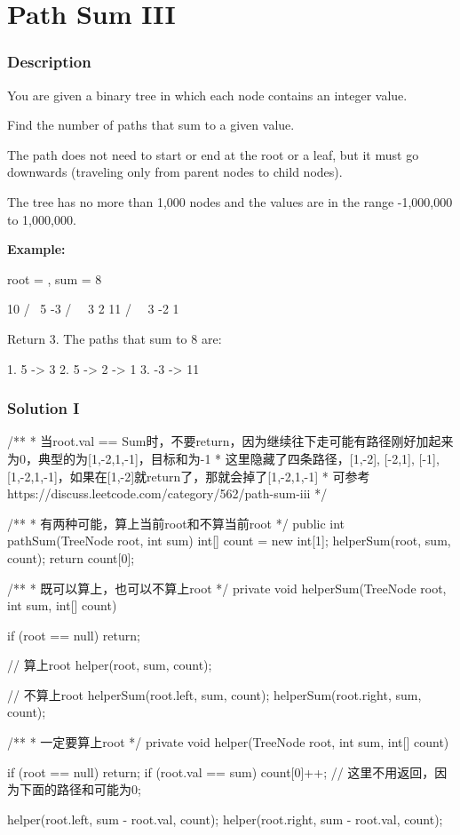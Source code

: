 \newpage

\section{Path Sum III} %

\subsubsection{Description}
You are given a binary tree in which each node contains an integer value.

Find the number of paths that sum to a given value.

The path does not need to start or end at the root or a leaf, but it must go downwards (traveling only from parent nodes to child nodes).

The tree has no more than 1,000 nodes and the values are in the range -1,000,000 to 1,000,000.

\textbf{Example:}

root = , sum = 8
\begin{Code}
      10
     /  \
    5   -3
   / \    \
  3   2   11
 / \   \
3  -2   1
\end{Code}

Return 3. The paths that sum to 8 are:
\begin{Code}
1.  5 -> 3
2.  5 -> 2 -> 1
3. -3 -> 11
\end{Code}

\newpage

\subsubsection{Solution I}

\begin{Code}
/**
 * 当root.val == Sum时，不要return，因为继续往下走可能有路径刚好加起来为0，典型的为[1,-2,1,-1]，目标和为-1
 * 这里隐藏了四条路径，[1,-2], [-2,1], [-1], [1,-2,1,-1]，如果在[1,-2]就return了，那就会掉了[1,-2,1,-1]
 * 可参考https://discuss.leetcode.com/category/562/path-sum-iii
 */

/**
 * 有两种可能，算上当前root和不算当前root
 */
public int pathSum(TreeNode root, int sum) {
    int[] count = new int[1];
    helperSum(root, sum, count);
    return count[0];
}

/**
 *  既可以算上，也可以不算上root
 */
private void helperSum(TreeNode root, int sum, int[] count) {
    if (root == null) {
        return;
    }

    // 算上root
    helper(root, sum, count);

    // 不算上root
    helperSum(root.left, sum, count);
    helperSum(root.right, sum, count);
}

/**
 * 一定要算上root
 */
private void helper(TreeNode root, int sum, int[] count) {
    if (root == null) {
        return;
    }
    if (root.val == sum) {
        count[0]++;
       // 这里不用返回，因为下面的路径和可能为0;
    }

    helper(root.left, sum - root.val, count);
    helper(root.right, sum - root.val, count);
}
\end{Code}

